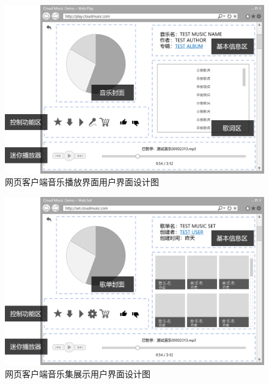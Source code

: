 \begin{figure}[h!]
  \centering
 
  \includegraphics[width=.99\linewidth]{figures/web_music}

  \caption{ \label{fig:web_music}
  		网页客户端音乐播放界面用户界面设计图
    }
\end{figure}

\begin{figure}[h!]
  \centering

  \includegraphics[width=.99\linewidth]{figures/web_collection}

  \caption{  \label{fig:web_collection}
  		网页客户端音乐集展示用户界面设计图
    }
\end{figure}
\newpage
